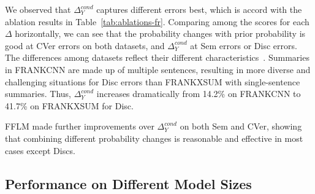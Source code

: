 We observed that $\Delta_{Y}^{cond}$ captures different errors best, which is accord with the ablation results in Table~\ref{tab:ablations-fr}. Comparing among the scores for each $\Delta$ horizontally, we can see that the probability changes with prior probability is good at CVer errors on both datasets, and $\Delta_{Y}^{cond}$ at Sem errors or Disc errors. The differences among datasets reflect their different characteristics~\cite{pagnoni2021understanding}. Summaries in FRANKCNN are made up of multiple sentences, resulting in more diverse and challenging situations for Disc errors than FRANKXSUM with single-sentence summaries. Thus, $\Delta_{Y}^{cond}$  increases dramatically from 14.2\% on FRANKCNN to 41.7\% on FRANKXSUM for Disc.

FFLM made further improvements over $\Delta_{Y}^{cond}$  on both Sem and CVer, showing that combining different probability changes is reasonable and effective in most cases except Discs. 






\subsection{Performance on Different Model Sizes}

